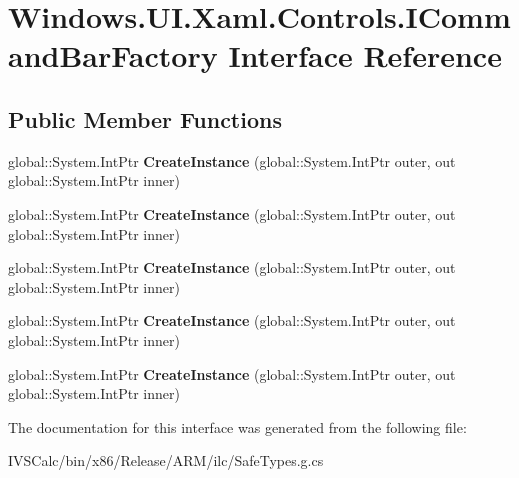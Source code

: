 \hypertarget{interface_windows_1_1_u_i_1_1_xaml_1_1_controls_1_1_i_command_bar_factory}{}\section{Windows.\+U\+I.\+Xaml.\+Controls.\+I\+Command\+Bar\+Factory Interface Reference}
\label{interface_windows_1_1_u_i_1_1_xaml_1_1_controls_1_1_i_command_bar_factory}
\subsection*{Public Member Functions}
\begin{DoxyCompactItemize}
\item 
\mbox{\label{interface_windows_1_1_u_i_1_1_xaml_1_1_controls_1_1_i_command_bar_factory_a0a03d54dd4e84e92150bbbb628459a2b}} 
global\+::\+System.\+Int\+Ptr {\bfseries Create\+Instance} (global\+::\+System.\+Int\+Ptr outer, out global\+::\+System.\+Int\+Ptr inner)
\item 
\mbox{\label{interface_windows_1_1_u_i_1_1_xaml_1_1_controls_1_1_i_command_bar_factory_a0a03d54dd4e84e92150bbbb628459a2b}} 
global\+::\+System.\+Int\+Ptr {\bfseries Create\+Instance} (global\+::\+System.\+Int\+Ptr outer, out global\+::\+System.\+Int\+Ptr inner)
\item 
\mbox{\label{interface_windows_1_1_u_i_1_1_xaml_1_1_controls_1_1_i_command_bar_factory_a0a03d54dd4e84e92150bbbb628459a2b}} 
global\+::\+System.\+Int\+Ptr {\bfseries Create\+Instance} (global\+::\+System.\+Int\+Ptr outer, out global\+::\+System.\+Int\+Ptr inner)
\item 
\mbox{\label{interface_windows_1_1_u_i_1_1_xaml_1_1_controls_1_1_i_command_bar_factory_a0a03d54dd4e84e92150bbbb628459a2b}} 
global\+::\+System.\+Int\+Ptr {\bfseries Create\+Instance} (global\+::\+System.\+Int\+Ptr outer, out global\+::\+System.\+Int\+Ptr inner)
\item 
\mbox{\label{interface_windows_1_1_u_i_1_1_xaml_1_1_controls_1_1_i_command_bar_factory_a0a03d54dd4e84e92150bbbb628459a2b}} 
global\+::\+System.\+Int\+Ptr {\bfseries Create\+Instance} (global\+::\+System.\+Int\+Ptr outer, out global\+::\+System.\+Int\+Ptr inner)
\end{DoxyCompactItemize}


The documentation for this interface was generated from the following file\+:\begin{DoxyCompactItemize}
\item 
I\+V\+S\+Calc/bin/x86/\+Release/\+A\+R\+M/ilc/Safe\+Types.\+g.\+cs\end{DoxyCompactItemize}
